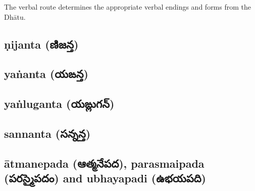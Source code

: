 \documentclass[12pt,a4paper]{article}
\newcommand{\te}[1]{{\telugufont #1}}
\begin{document}
The verbal route determines the appropriate verbal endings and
forms from the Dhātu.

\subsection{ṇijanta (\te{ణిజన్త})}

\subsection{yaṅanta (\te{యఙన్త})}

\subsection{yaṅluganta (\te{యఙ్లుగన్})}

\subsection{sannanta (\te{సన్నన్త})} 

\subsection{ātmanepada (\te{ఆత్మనేపద}), parasmaipada (\te{పరస్మైపదం}) and ubhayapadi (\te{ఉభయపది})}
\end{document}
